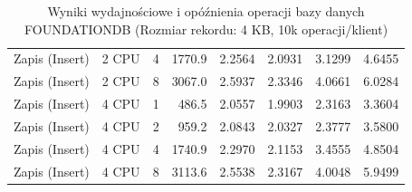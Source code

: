 \begin{table}[ht]
{\begin{tabular}{llcrrrrr}
Zapis (Insert) & 2 CPU & 4 & 1770.9 & 2.2564 & 2.0931 & 3.1299 & 4.6455 \\
Zapis (Insert) & 2 CPU & 8 & 3067.0 & 2.5937 & 2.3346 & 4.0661 & 6.0284 \\
Zapis (Insert) & 4 CPU & 1 & 486.5 & 2.0557 & 1.9903 & 2.3163 & 3.3604 \\
Zapis (Insert) & 4 CPU & 2 & 959.2 & 2.0843 & 2.0327 & 2.3777 & 3.5800 \\
Zapis (Insert) & 4 CPU & 4 & 1740.9 & 2.2970 & 2.1153 & 3.4555 & 4.8504 \\
Zapis (Insert) & 4 CPU & 8 & 3113.6 & 2.5538 & 2.3167 & 4.0048 & 5.9499 \\
\bottomrule
\end{tabular}%
}
\caption{Wyniki wydajnościowe i opóźnienia operacji bazy danych FOUNDATIONDB (Rozmiar rekordu: 4 KB, 10k operacji/klient)}
\label{tab:latency_foundationdb_medium_10000}
\end{table}
